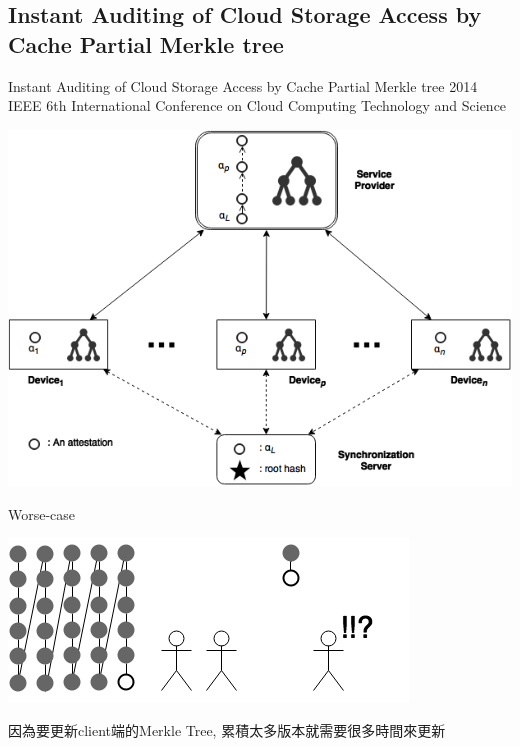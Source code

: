 \documentclass{beamer}
\begin{document}
\begin{CJK}{UTF8}{bkai}
\subsection{\small{Instant Auditing of Cloud Storage Access by Cache Partial Merkle tree}}
\begin{frame}{\normalsize{Instant Auditing of Cloud Storage Access by Cache Partial Merkle tree}}
{\tiny{2014 IEEE 6th International Conference on Cloud Computing Technology and Science}}
	\begin{center}
	\includegraphics[width=.8\textwidth]{wei_shian.png}
	\end{center}
\end{frame}

\begin{frame}{Worse-case}
	\begin{center}
	\includegraphics[width=.7\textwidth]{Problem2.png}
	\end{center}
	\alert{因為要更新client端的Merkle Tree, 累積太多版本就需要很多時間來更新}
\end{frame}


\end{CJK}
\end{document}
